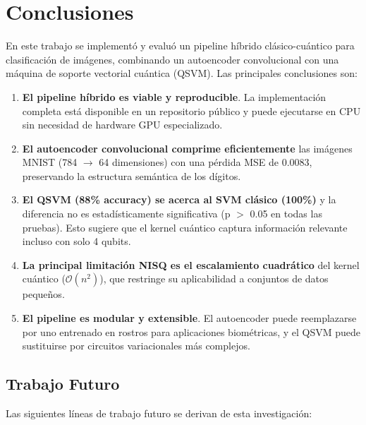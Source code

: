 \documentclass[conference]{IEEEtran}
\begin{document}
\section{Conclusiones}
\label{sec:conclusiones}

En este trabajo se implementó y evaluó un pipeline híbrido clásico-cuántico 
para clasificación de imágenes, combinando un autoencoder convolucional con 
una máquina de soporte vectorial cuántica (QSVM). Las principales conclusiones 
son:

\begin{enumerate}
    \item \textbf{El pipeline híbrido es viable y reproducible}. La 
          implementación completa está disponible en un repositorio público y 
          puede ejecutarse en CPU sin necesidad de hardware GPU especializado.
    
    \item \textbf{El autoencoder convolucional comprime eficientemente} las 
          imágenes MNIST (784 $\to$ 64 dimensiones) con una pérdida MSE de 
          0.0083, preservando la estructura semántica de los dígitos.
    
    \item \textbf{El QSVM (88\% accuracy) se acerca al SVM clásico (100\%)} 
          y la diferencia no es estadísticamente significativa (p $>$ 0.05 en 
          todas las pruebas). Esto sugiere que el kernel cuántico captura 
          información relevante incluso con solo 4 qubits.
    
    \item \textbf{La principal limitación NISQ es el escalamiento cuadrático} 
          del kernel cuántico ($\mathcal{O}(n^2)$), que restringe su 
          aplicabilidad a conjuntos de datos pequeños.
    
    \item \textbf{El pipeline es modular y extensible}. El autoencoder puede 
          reemplazarse por uno entrenado en rostros para aplicaciones 
          biométricas, y el QSVM puede sustituirse por circuitos variacionales 
          más complejos.
\end{enumerate}

\subsection{Trabajo Futuro}

Las siguientes líneas de trabajo futuro se derivan de esta investigación:
\end{document}
